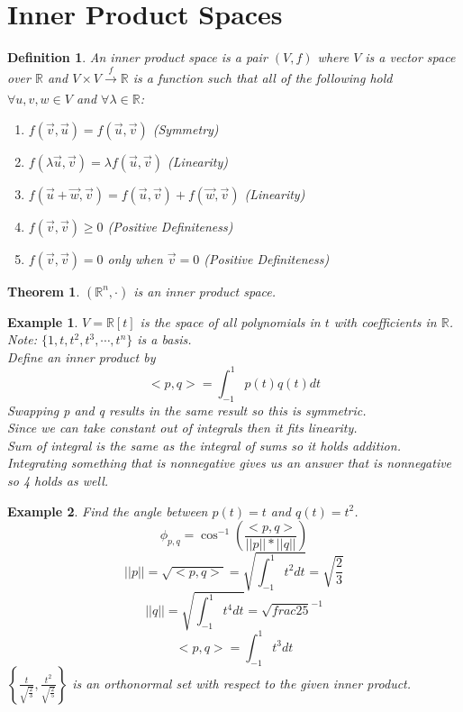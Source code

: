 \documentclass{report}
\newtheorem*{ex}{Example}
\newtheorem*{defn}{Definition}
\newtheorem*{thrm}{Theorem}
\begin{document}
\section{Inner Product Spaces}
\begin{defn}
An inner product space is a pair $(V,f)$ where $V$ is a vector space over $\mathbb{R}$ and $V\times V\xrightarrow[]{f}\mathbb{R}$ is a function such that all of the following hold $\forall u,v,w\in V$ and $\forall \lambda \in \mathbb{R}$:
\begin{enumerate}
\item $f(\vec{v},\vec{u})=f(\vec{u},\vec{v})$ (Symmetry)
\item $f(\lambda \vec{u},\vec{v}) = \lambda f(\vec{u},\vec{v})$ (Linearity)
\item $f(\vec{u}+\vec{w},\vec{v})=f(\vec{u},\vec{v})+f(\vec{w},\vec{v})$ (Linearity)
\item $f(\vec{v},\vec{v}) \geq 0$ (Positive Definiteness)
\item $f(\vec{v},\vec{v})=0$ only when $\vec{v}=0$ (Positive Definiteness)
\end{enumerate}
\end{defn}
\begin{thrm}
$(\mathbb{R}^n, \cdot)$ is an inner product space.
\end{thrm}
\begin{ex}
$V=\mathbb{R}[t]$ is the space of all polynomials in $t$ with coefficients in $\mathbb{R}$.\\
Note: $\{1,t,t^2,t^3,\cdots,t^n\}$ is a basis.\\
Define an inner product by
\[ <p,q>=\int_{-1}^1p(t)q(t)dt \]
Swapping p and q results in the same result so this is symmetric.\\
Since we can take constant out of integrals then it fits linearity.\\
Sum of integral is the same as the integral of sums so it holds addition.\\
Integrating something that is nonnegative gives us an answer that is nonnegative so 4 holds as well.
\end{ex}
\begin{ex}
Find the angle between $p(t)=t$ and $q(t)=t^2$.
\[ \phi_{p,q}=\cos^{-1}(\frac{<p,q>}{||p||*||q||}) \]
\[ ||p|| = \sqrt{<p,q>} = \sqrt{\int_{-1}^1t^2dt}=\sqrt{\frac{2}{3}} \]
\[ ||q|| = \sqrt{\int_{-1}^1t^4dt} = \sqrt{frac{2}{5}}^{-1} \]
\[ <p,q>=\int_{-1}^1t^3dt \]
$\left\{\frac{t}{\sqrt{\frac{2}{3}}},\frac{t^2}{\sqrt{\frac{2}{5}}}\right\}$ is an orthonormal set with respect to the given inner product.
\end{ex}
\end{document}
